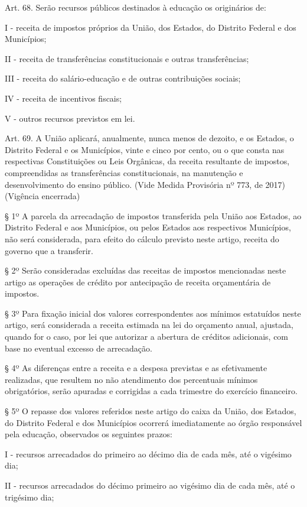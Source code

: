\documentclass[
]{book}
\begin{document}
Art. 68. Serão recursos públicos destinados à educação os originários de:

I - receita de impostos próprios da União, dos Estados, do Distrito Federal e dos Municípios;

II - receita de transferências constitucionais e outras transferências;

III - receita do salário-educação e de outras contribuições sociais;

IV - receita de incentivos fiscais;

V - outros recursos previstos em lei.

Art. 69. A União aplicará, anualmente, nunca menos de dezoito, e os Estados, o Distrito Federal e os Municípios, vinte e cinco por cento, ou o que consta nas respectivas Constituições ou Leis Orgânicas, da receita resultante de impostos, compreendidas as transferências constitucionais, na manutenção e desenvolvimento do ensino público. (Vide Medida Provisória nº 773, de 2017) (Vigência encerrada)

§ 1º A parcela da arrecadação de impostos transferida pela União aos Estados, ao Distrito Federal e aos Municípios, ou pelos Estados aos respectivos Municípios, não será considerada, para efeito do cálculo previsto neste artigo, receita do governo que a transferir.

§ 2º Serão consideradas excluídas das receitas de impostos mencionadas neste artigo as operações de crédito por antecipação de receita orçamentária de impostos.

§ 3º Para fixação inicial dos valores correspondentes aos mínimos estatuídos neste artigo, será considerada a receita estimada na lei do orçamento anual, ajustada, quando for o caso, por lei que autorizar a abertura de créditos adicionais, com base no eventual excesso de arrecadação.

§ 4º As diferenças entre a receita e a despesa previstas e as efetivamente realizadas, que resultem no não atendimento dos percentuais mínimos obrigatórios, serão apuradas e corrigidas a cada trimestre do exercício financeiro.

§ 5º O repasse dos valores referidos neste artigo do caixa da União, dos Estados, do Distrito Federal e dos Municípios ocorrerá imediatamente ao órgão responsável pela educação, observados os seguintes prazos:

I - recursos arrecadados do primeiro ao décimo dia de cada mês, até o vigésimo dia;

II - recursos arrecadados do décimo primeiro ao vigésimo dia de cada mês, até o trigésimo dia;
\end{document}
